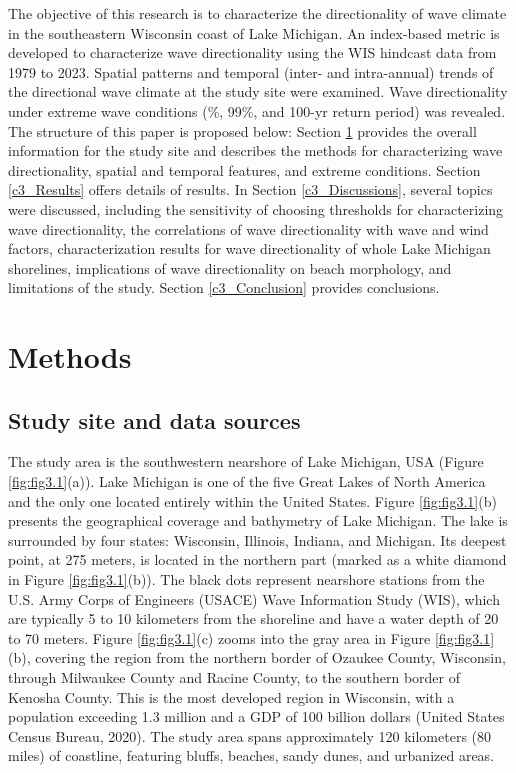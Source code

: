 The objective of this research is to characterize the directionality of wave
climate in the southeastern Wisconsin coast of Lake Michigan. An index-based
metric is developed to characterize wave directionality using the WIS hindcast
data from 1979 to 2023. Spatial patterns and temporal (\eg inter- and
intra-annual) trends of the directional wave climate at the study site were
examined. Wave directionality under extreme wave conditions (\%, 99\%, and
100-yr return period) was revealed. The structure of this paper is proposed
below: Section \ref{c3_Methods} provides the overall information for the study
site and describes the methods for characterizing wave directionality, spatial
and temporal features, and extreme conditions. Section \ref{c3_Results} offers
details of results. In Section \ref{c3_Discussions}, several topics were
discussed, including the sensitivity of choosing thresholds for characterizing
wave directionality, the correlations of wave directionality with wave and wind
factors, characterization results for wave directionality of whole Lake Michigan
shorelines, implications of wave directionality on beach morphology, and
limitations of the study. Section \ref{c3_Conclusion} provides conclusions.

\section{Methods}
\label{c3_Methods}

\subsection{Study site and data sources}
\label{c3_Study site and data sources}

The study area is the southwestern nearshore of Lake Michigan, USA (Figure
\ref{fig:fig3.1}(a)). Lake Michigan is one of the five Great Lakes of North
America and the only one located entirely within the United States. Figure
\ref{fig:fig3.1}(b) presents the geographical coverage and bathymetry of Lake
Michigan. The lake is surrounded by four states: Wisconsin, Illinois, Indiana,
and Michigan. Its deepest point, at 275 meters, is located in the northern part
(marked as a white diamond in Figure \ref{fig:fig3.1}(b)). The black dots
represent nearshore stations from the U.S. Army Corps of Engineers (USACE) Wave
Information Study (WIS), which are typically 5 to 10 kilometers from the
shoreline and have a water depth of 20 to 70 meters. Figure \ref{fig:fig3.1}(c)
zooms into the gray area in Figure \ref{fig:fig3.1}(b), covering the region from
the northern border of Ozaukee County, Wisconsin, through Milwaukee County and
Racine County, to the southern border of Kenosha County. This is the most
developed region in Wisconsin, with a population exceeding 1.3 million and a GDP
of 100 billion dollars (United States Census Bureau, 2020). The study area spans
approximately 120 kilometers (80 miles) of coastline, featuring bluffs, beaches,
sandy dunes, and urbanized areas. 

